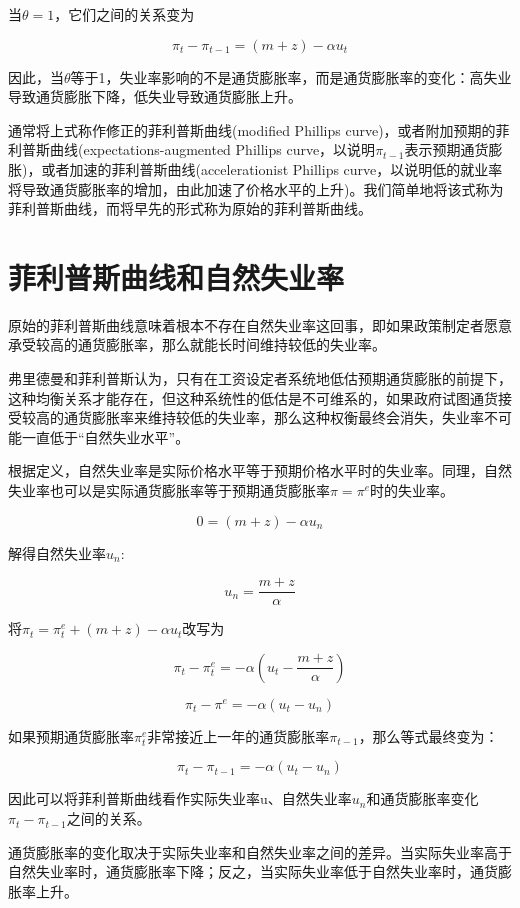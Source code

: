 \documentclass{article}
\begin{document}
当$ \theta=1  $，它们之间的关系变为

\[
\pi_t-\pi_{t-1}=(m+z)-\alpha u_t
\]

因此，当$ \theta $等于1，失业率影响的不是通货膨胀率，而是通货膨胀率的变化：高失业导致通货膨胀下降，低失业导致通货膨胀上升。

通常将上式称作修正的菲利普斯曲线(modified Phillips curve)，或者附加预期的菲利普斯曲线(expectations-augmented Phillips curve，以说明$ \pi_{t-1} $表示预期通货膨胀)，或者加速的菲利普斯曲线(accelerationist Phillips curve，以说明低的就业率将导致通货膨胀率的增加，由此加速了价格水平的上升)。我们简单地将该式称为菲利普斯曲线，而将早先的形式称为原始的菲利普斯曲线。

\section{菲利普斯曲线和自然失业率}

原始的菲利普斯曲线意味着根本不存在自然失业率这回事，即如果政策制定者愿意承受较高的通货膨胀率，那么就能长时间维持较低的失业率。

弗里德曼和菲利普斯认为，只有在工资设定者系统地低估预期通货膨胀的前提下，这种均衡关系才能存在，但这种系统性的低估是不可维系的，如果政府试图通货接受较高的通货膨胀率来维持较低的失业率，那么这种权衡最终会消失，失业率不可能一直低于“自然失业水平”。

\hspace*{\fill}

根据定义，自然失业率是实际价格水平等于预期价格水平时的失业率。同理，自然失业率也可以是实际通货膨胀率等于预期通货膨胀率$ \pi=\pi^e $时的失业率。

\[
0=(m+z)-\alpha u_n
\]

解得自然失业率$ u_n $:

\[
u_n=\frac{m+z}{\alpha}
\]

将$ \pi_t=\pi^e_t+(m+z)-\alpha u_t $改写为

\[
\pi_t-\pi_t^e=-\alpha(u_t-\frac{m+z}{\alpha})
\]

\[
\pi_t-\pi^e=-\alpha(u_t-u_n)
\]

如果预期通货膨胀率$ \pi^e_t $非常接近上一年的通货膨胀率$ \pi_{t-1} $，那么等式最终变为：

\[
\pi_t-\pi_{t-1}=-\alpha(u_t-u_n)
\]

因此可以将菲利普斯曲线看作实际失业率u、自然失业率$ u_n $和通货膨胀率变化$ \pi_t-\pi_{t-1} $之间的关系。

通货膨胀率的变化取决于实际失业率和自然失业率之间的差异。当实际失业率高于自然失业率时，通货膨胀率下降；反之，当实际失业率低于自然失业率时，通货膨胀率上升。
\end{document}
